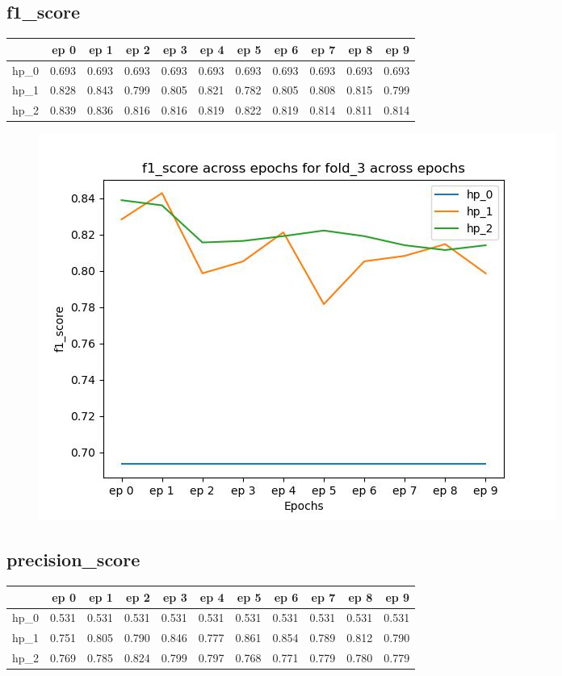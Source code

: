 \documentclass{article}
\begin{document}
\subsection{f1\_score}
\begin{tabular}{lrrrrrrrrrr}
\toprule
{} &   ep 0 &   ep 1 &   ep 2 &   ep 3 &   ep 4 &   ep 5 &   ep 6 &   ep 7 &   ep 8 &   ep 9 \\
\midrule
hp\_0 &  0.693 &  0.693 &  0.693 &  0.693 &  0.693 &  0.693 &  0.693 &  0.693 &  0.693 &  0.693 \\
hp\_1 &  0.828 &  0.843 &  0.799 &  0.805 &  0.821 &  0.782 &  0.805 &  0.808 &  0.815 &  0.799 \\
hp\_2 &  0.839 &  0.836 &  0.816 &  0.816 &  0.819 &  0.822 &  0.819 &  0.814 &  0.811 &  0.814 \\
\bottomrule
\end{tabular}

\begin{figure}[H]
\includegraphics[scale = 0.75]{fold_3/f1_score}
\end{figure}
\subsection{precision\_score}
\begin{tabular}{lrrrrrrrrrr}
\toprule
{} &   ep 0 &   ep 1 &   ep 2 &   ep 3 &   ep 4 &   ep 5 &   ep 6 &   ep 7 &   ep 8 &   ep 9 \\
\midrule
hp\_0 &  0.531 &  0.531 &  0.531 &  0.531 &  0.531 &  0.531 &  0.531 &  0.531 &  0.531 &  0.531 \\
hp\_1 &  0.751 &  0.805 &  0.790 &  0.846 &  0.777 &  0.861 &  0.854 &  0.789 &  0.812 &  0.790 \\
hp\_2 &  0.769 &  0.785 &  0.824 &  0.799 &  0.797 &  0.768 &  0.771 &  0.779 &  0.780 &  0.779 \\
\bottomrule
\end{tabular}
\end{document}
